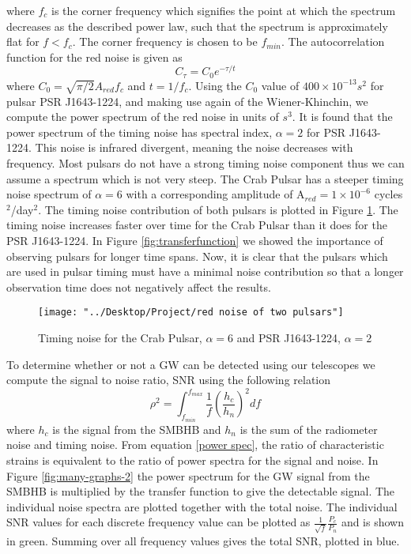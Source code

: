 \documentclass[12pt]{article}
\begin{document}
	where $f_{c}$ is the corner frequency which signifies the point at which the spectrum decreases as the described power law, such that the spectrum is approximately flat for $f<f_{c}$. The corner frequency is chosen to be $f_{min}$.
	The autocorrelation function for the red noise is given as
	\begin{equation}\label{autocorr for red noise}
	C_{\tau}=C_0 e^{-\tau/t}
	\end{equation}
	where $C_0=\sqrt{\pi/2}A_{red}f_{c}$ and $t=1/f_{c}$. Using the $C_0$ value of $400 \times 10^{-13} s^2$ for pulsar PSR J1643-1224, and making use again of the Wiener-Khinchin, we compute the power spectrum of the red noise in units of $s^3$. It is found that the power spectrum of the timing noise has spectral index, $\alpha=2$ for PSR J1643-1224. This noise is infrared divergent, meaning the noise decreases with frequency. Most pulsars do not have a strong timing noise component thus we can assume a spectrum which is not very steep. The Crab Pulsar has a steeper timing noise spectrum of $\alpha=6$ with a corresponding amplitude of A$_{red}=1 \times 10^{-6}$ cycles$^2$/day$^2$. The timing noise contribution of both pulsars is plotted in Figure \ref{fig:red-noise-of-two-pulsars}. The timing noise increases faster over time for the Crab Pulsar than it does for the PSR J1643-1224. In Figure \ref{fig:transferfunction} we showed the importance of observing pulsars for longer time spans. Now, it is clear that the pulsars which are used in pulsar timing must have a minimal noise contribution so that a longer observation time does not negatively affect the results. 
	
\begin{figure}
	\texttt{[image: "../Desktop/Project/red noise of two pulsars"]}
	\caption{Timing noise for the Crab Pulsar, $\alpha=6$ and PSR J1643-1224, $\alpha=2$}
	\label{fig:red-noise-of-two-pulsars}
\end{figure}

	To determine whether or not a GW can be detected using our telescopes we compute the signal to noise ratio, SNR using the following relation 
	\begin{equation}\label{snr eqn}
	\rho^2=\int_{f_{min}}^{f_{max}}\frac{1}{f}{(\frac{h_c}{h_n})^2}df
	\end{equation}
	where $h_c$ is the signal from the SMBHB and $h_n$ is the sum of the radiometer noise and timing noise. From equation \ref{power spec}, the ratio of characteristic strains is equivalent to the ratio of power spectra for the signal and noise. In Figure \ref{fig:many-graphs-2} the power spectrum for the GW signal from the SMBHB is multiplied by the transfer function to give the detectable signal. The individual noise spectra are plotted together with the total noise. The individual SNR values for each discrete frequency value can be plotted as $\frac{1}{\sqrt{f}}\frac{P_{c}}{P_{n}}$ and is shown in green. Summing over all frequency values gives the total SNR, plotted in blue. 
	
\end{document}
